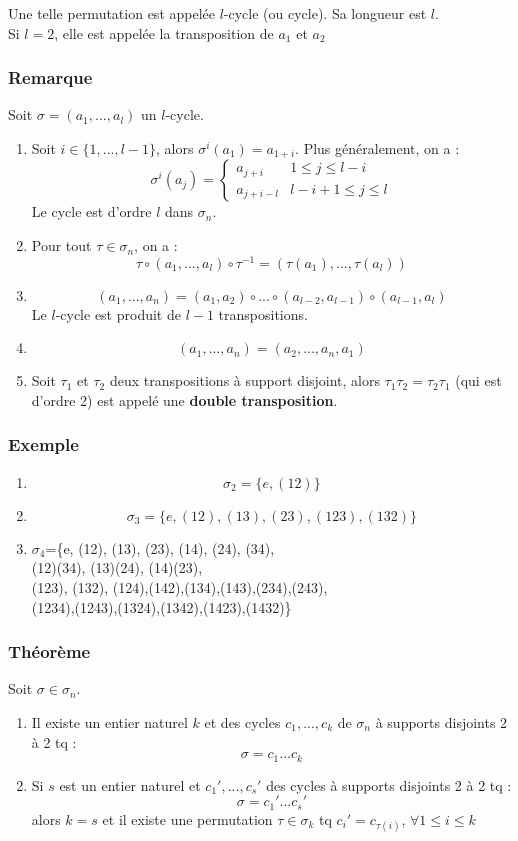 \documentclass[a4paper, oneside]{report}
\newcommand{\remar}{\subsubsection{Remarque}}
\newcommand{\exem}{\subsubsection{Exemple}}
\newcommand{\theo}{\subsubsection{Théorème}}
\begin{document}
Une telle permutation est appelée $l$-cycle (ou cycle). Sa longueur est $l$.\\
Si $l=2$, elle est appelée la transposition de $a_1$ et $a_2$

\remar
Soit $\sigma=(a_1,...,a_l)$ un $l$-cycle.
\begin{enumerate}
\item Soit $i\in \{1,...,l-1\}$, alors $\sigma^i(a_1)=a_{1+i}$. Plus généralement, on a :
$$\sigma^i(a_j)= \left\{\begin{array}{ll}
a_{j+i}& 1\leq j \leq l-i\\
a_{j+i-l}& l-i+1\leq j \leq l
\end{array}\right.$$
Le cycle est d'ordre $l$ dans $\sigma_n$.

\item Pour tout $\tau \in \sigma_n$, on a :
$$\tau \circ (a_1,...,a_l) \circ \tau^{-1}=(\tau(a_1),...,\tau(a_l))$$

\item 
$$ (a_1,...,a_n)=(a_1,a_2)\circ...\circ (a_{l-2}, a_{l-1}) \circ (a_{l-1}, a_l)$$
Le $l$-cycle est produit de $l-1$ transpositions.

\item 
$$(a_1,...,a_n)=(a_2,...,a_n,a_1)$$

\item Soit $\tau_1$ et $\tau_2$ deux transpositions à support disjoint, alors $\tau_1\tau_2 = \tau_2\tau_1$ (qui est d'ordre 2) est appelé une \textbf{double transposition}.
 
\end{enumerate}

\exem
\begin{enumerate}
\item $$\sigma_2=\{e, (12)\}$$
\item $$\sigma_3=\{e, (12), (13), (23), (123), (132)\}$$
\item
\begin{center}
$\sigma_4$=\{e, (12), (13), (23), (14), (24), (34),\\
(12)(34), (13)(24), (14)(23),\\
(123), (132), (124),(142),(134),(143),(234),(243),\\
(1234),(1243),(1324),(1342),(1423),(1432)\}
\end{center} 
\end{enumerate}

\theo
Soit $\sigma\in \sigma_n$.
\begin{enumerate}
\item Il existe un entier naturel $k$ et des cycles $c_1,...,c_k$ de $\sigma_n$ à supports disjoints 2 à 2 tq :
$$\sigma = c_1...c_k$$

\item Si $s$ est un entier naturel et $c_1',...,c_s'$ des cycles à supports disjoints 2 à 2 tq :
$$\sigma = c_1'...c_s'$$
alors $k=s$ et il existe une permutation $\tau \in \sigma_k$ tq $c_i'=c_{\tau(i)}$, $\forall 1\leq i \leq k$
\end{enumerate}
\end{document}

